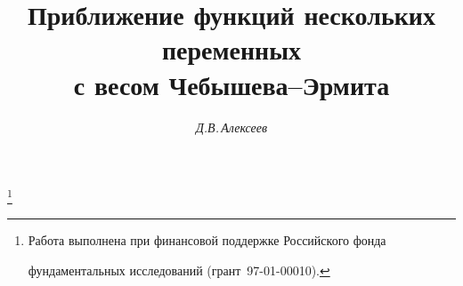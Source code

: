 

 


% 


 


\newcommand{\tts}[1]{} 


 




\setcounter{page}{3} 












 


\author{\it Д.В.\,Алексеев} 




\title{Приближение функций нескольких переменных\\ 


с весом Чебышева--Эрмита} 


\thanks{Работа выполнена при финансовой поддержке Российского фонда 


фундаментальных исследований (грант \No\,97-01-00010).} 


 


\date{} 




\pagestyle{plain} %


 




\maketitle 


